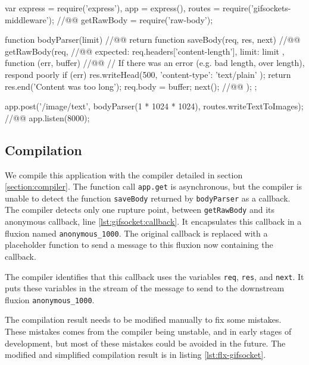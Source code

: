\begin{code}[js, caption={Simplified version of gifsockets-server},label={lst:gifsocket}]
var express = require('express'),
    app = express(),
    routes = require('gifsockets-middleware'); //@\label{lst:gifsocket:gif-mw}@
    getRawBody = require('raw-body');

function bodyParser(limit) { //@\label{lst:gifsocket:bodyParser}@
  return function saveBody(req, res, next) { //@\label{lst:gifsocket:saveBody}@
    getRawBody(req, { //@\label{lst:gifsocket:getRawBody}@
      expected: req.headers['content-length'],
      limit: limit
    }, function (err, buffer) { //@\label{lst:gifsocket:callback}@
      // If there was an error (e.g. bad length, over length), respond poorly
      if (err) {
        res.writeHead(500, {
          'content-type': 'text/plain'
        });
        return res.end('Content was too long');
      }
      req.body = buffer;
      next(); //@\label{lst:gifsocket:next}@
    });
  };
}

app.post('/image/text', bodyParser(1 * 1024 * 1024), routes.writeTextToImages); //@\label{lst:gifsocket:app.post}@
app.listen(8000);
\end{code}


\subsection{Compilation}

We compile this application with the compiler detailed in section \ref{section:compiler}.
The function call \texttt{app.get} is asynchronous, but the compiler is unable to detect the function \texttt{saveBody} returned by \texttt{bodyParser} as a callback.
The compiler detects only one rupture point, between \texttt{getRawBody} and its anonymous callback, line \ref{lst:gifsocket:callback}.
It encapsulates this callback in a fluxion named \texttt{anonymous\-\_1000}.
The original callback is replaced with a placeholder function to send a message to this fluxion now containing the callback.

The compiler identifies that this callback uses the variables \texttt{req}, \texttt{res}, and \texttt{next}.
It puts these variables in the stream of the message to send to the downstream fluxion \texttt{anonymous\-\_1000}.

The compilation result needs to be modified manually to fix some mistakes.
These mistakes comes from the compiler being unstable, and in early stages of development, but most of these mistakes could be avoided in the future.
The modified and simplified compilation result is in listing \ref{lst:flx-gifsocket}.

